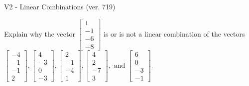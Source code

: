 \begin{exercise}
  \begin{exerciseTitle}V2 - Linear Combinations (ver. 719)\end{exerciseTitle}
  \begin{exerciseStatement}
    Explain why the vector \(\left[\begin{array}{c}
1 \\
-1 \\
-6 \\
-8
\end{array}\right]\)  is or is not a linear 
	combination of the vectors \(\left[\begin{array}{c}
-4 \\
-1 \\
-1 \\
2
\end{array}\right] , \left[\begin{array}{c}
4 \\
-3 \\
0 \\
-3
\end{array}\right] , \left[\begin{array}{c}
2 \\
-1 \\
-4 \\
1
\end{array}\right] , \left[\begin{array}{c}
4 \\
2 \\
-7 \\
3
\end{array}\right] , \text{ and } \left[\begin{array}{c}
6 \\
0 \\
-3 \\
-1
\end{array}\right]\).
	



\end{exerciseStatement}
\end{exercise}
